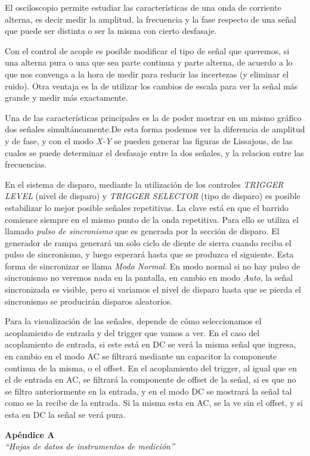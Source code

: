 \documentclass{article}
\begin{document}
	El osciloscopio permite estudiar las características de una onda de corriente alterna, es decir medir la amplitud, la frecuencia y la fase respecto de una señal que puede ser distinta o ser la misma con cierto desfasaje.
	\par
	Con el control de acople es posible modificar el tipo de señal que queremos, si una alterna pura o una que sea parte continua y parte alterna, de acuerdo a lo que nos convenga a la hora de medir para reducir las incertezas (y eliminar el ruido). Otra ventaja es la de utilizar los cambios de escala para ver la señal más grande y medir más exactamente. 
	\par
	Una de las características principales es la de poder mostrar en un mismo gráfico dos señales simultáneamente.De esta forma podemos ver la diferencia de amplitud y de fase, y con el modo \textit{X-Y} se pueden generar las figuras de Lissajous, de las cuales se puede determinar el desfasaje entre la dos señales, y la relacion entre las frecuencias.
	\par
	En el sistema de disparo, mediante la utilización de los controles \textit{TRIGGER LEVEL} (nivel de disparo) y \textit{TRIGGER SELECTOR} (tipo de disparo) es posible estabilizar lo mejor posible señales repetitivas. La clave está en que el barrido comience siempre en el mismo punto de la onda repetitiva. Para ello se utiliza el llamado \textit{pulso de sincronismo} que es generada por la sección de disparo. El generador de rampa generará un solo ciclo de diente de sierra cuando reciba el pulso de sincronismo, y luego esperará hasta que se produzca el siguiente. Esta forma de sincronizar se llama \textit{Modo Normal}. En modo normal si no hay pulso de sincronismo no veremos nada en la pantalla, en cambio en modo \textit{Auto}, la señal sincronizada es visible, pero si variamos el nivel de disparo hasta que se pierda el sincronismo se producirán disparos aleatorios.
	\par
	Para la visualización de las señales, depende de cómo seleccionamos el acoplamiento de entrada y del trigger que vamos a ver. En el caso del acoplamiento de entrada, si este está en DC se verá la misma señal que ingresa, en cambio en el modo AC se filtrará mediante un capacitor la componente continua de la misma, o el offset. En el acoplamiento del trigger, al igual que en el de entrada en AC, se filtrará la componente de offset de la señal, si es que no se filtro anteriormente en la entrada,  y en el modo DC se mostrará la señal tal como se la recibe de la entrada. Si la misma esta en AC, se la ve sin el offset, y si esta en DC la señal se verá pura.
	\bigskip\bigskip





\newpage
\vspace*{4cm}
\begin{center}
	\textbf{\Huge{Apéndice A}} \\
	\bigskip\bigskip
	\Large{\textit{``Hojas de datos de instrumentos de medición''}}
\end{center}
\end{document}
